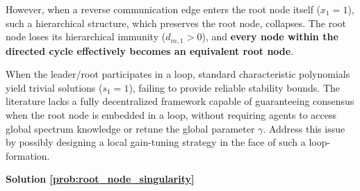 \documentclass[openright,twoside]{iitbthesis}
\begin{document}
However, when a reverse communication edge enters the root node itself ($x_1 = 1$), such a hierarchical structure, which preserves the root node, collapses. The root node loses its hierarchical immunity ($d_{in,1} > 0$), and \textbf{every node within the directed cycle effectively becomes an equivalent root node}.
\begin{problem}\label{prob:root_node_singularity}
    When the leader/root participates in a loop, standard characteristic polynomials yield trivial solutions ($s_1 = 1$), failing to provide reliable stability bounds. The literature lacks a fully decentralized framework capable of guaranteeing consensus when the root node is embedded in a loop, without requiring agents to access global spectrum knowledge or retune the global parameter $\gamma$. Address this issue by possibly designing a local gain-tuning strategy in the face of such a loop-formation.
\end{problem}
\noindent \textbf{Solution \ref{prob:root_node_singularity}}
\end{document}
